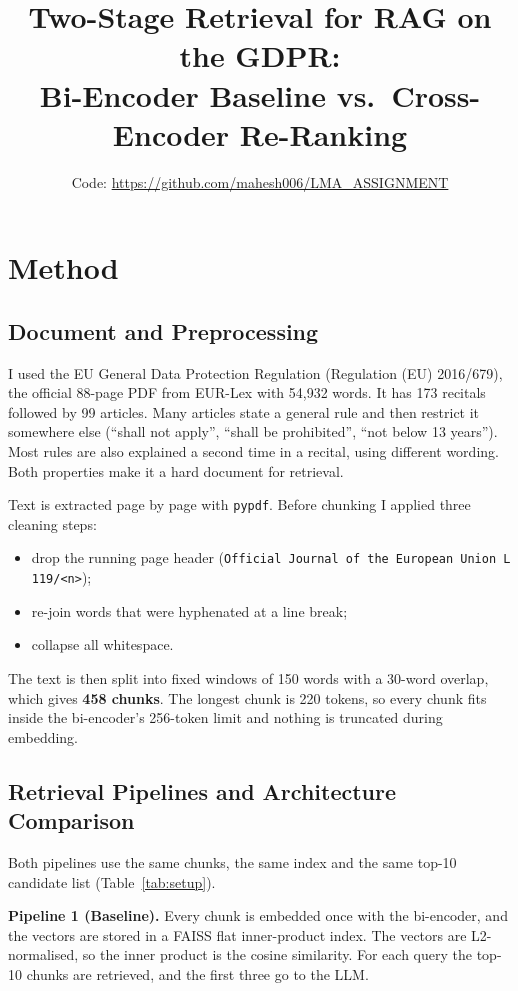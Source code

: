 \documentclass[10pt,a4paper]{article}
\title{Two-Stage Retrieval for RAG on the GDPR:\\Bi-Encoder Baseline vs.\ Cross-Encoder Re-Ranking}
\author{\small Code: \url{https://github.com/mahesh006/LMA_ASSIGNMENT}}
\date{}
\begin{document}
\maketitle
\vspace{-1.5em}

\section{Method}

\subsection{Document and Preprocessing}
I used the EU General Data Protection Regulation (Regulation (EU) 2016/679), the official
88-page PDF from EUR-Lex with 54,932 words. It has 173 recitals followed by 99 articles. Many
articles state a general rule and then restrict it somewhere else (``shall not apply'',
``shall be prohibited'', ``not below 13 years''). Most rules are also explained a second
time in a recital, using different wording. Both properties make it a hard document for
retrieval.

Text is extracted page by page with \texttt{pypdf}. Before chunking I applied three cleaning steps:
\begin{itemize}
  \item drop the running page header (\texttt{Official Journal of the European Union L 119/<n>});
  \item re-join words that were hyphenated at a line break;
  \item collapse all whitespace.
\end{itemize}
The text is then split into fixed windows of 150 words with a 30-word overlap, which gives
\textbf{458 chunks}. The longest chunk is 220 tokens, so every chunk fits inside the
bi-encoder's 256-token limit and nothing is truncated during embedding.

\subsection{Retrieval Pipelines and Architecture Comparison}
Both pipelines use the same chunks, the same index and the same top-10 candidate list
(Table~\ref{tab:setup}).

\textbf{Pipeline 1 (Baseline).} Every chunk is embedded once with the bi-encoder, and the vectors
are stored in a FAISS flat inner-product index. The vectors are L2-normalised, so the inner
product is the cosine similarity. For each query the top-10 chunks are retrieved, and the
first three go to the LLM.
\end{document}
